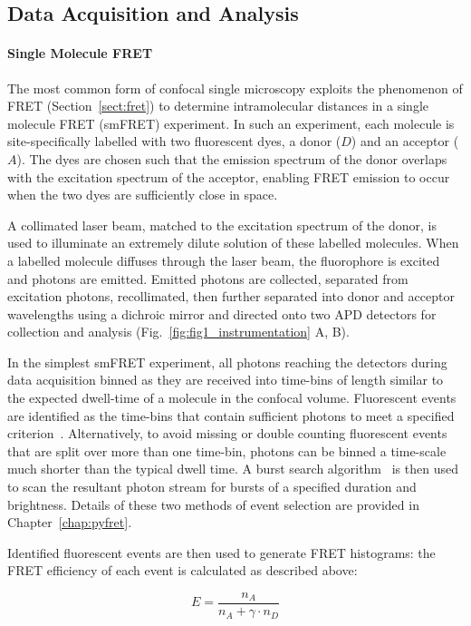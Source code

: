 \subsection{Data Acquisition and Analysis}
\paragraph{Single Molecule FRET}
The most common form of confocal single microscopy exploits the phenomenon of FRET (Section~\ref{sect:fret}) to determine intramolecular distances in a single molecule FRET (smFRET) experiment. In such an experiment, each molecule is site-specifically labelled with two fluorescent dyes, a donor ($D$) and an acceptor ($A$). The dyes are chosen such that the emission spectrum of the donor overlaps with the excitation spectrum of the acceptor, enabling FRET emission to occur when the two dyes are sufficiently close in space. 

A collimated laser beam, matched to the excitation spectrum of the donor, is used to illuminate an extremely dilute solution of these labelled molecules. When a labelled molecule diffuses through the laser beam, the fluorophore is excited and photons are emitted.  Emitted photons are collected, separated from excitation photons, recollimated, then further separated into donor and acceptor wavelengths using a dichroic mirror and directed onto two APD detectors for collection and analysis (Fig.~\ref{fig:fig1_instrumentation} A, B).

In the simplest smFRET experiment, all photons reaching the detectors during data acquisition binned as they are received into time-bins of length similar to the expected dwell-time of a molecule in the confocal volume. Fluorescent events are identified as the time-bins that contain sufficient photons to meet a specified criterion~\cite{weiss00}. Alternatively, to avoid missing or double counting fluorescent events that are split over more than one time-bin, photons can be binned a time-scale much shorter than the typical dwell time. A burst search algorithm~\cite{nir06} is then used to scan the resultant photon stream for bursts of a specified duration and brightness. Details of these two methods of event selection are provided in Chapter~\ref{chap:pyfret}.

Identified fluorescent events are then used to generate FRET histograms: the FRET efficiency of each event is calculated as described above:

\begin{equation}
E = \frac{n_A}{n_A + \gamma \cdot n_D}
\label{eq:Eprod}
\end{equation} 


